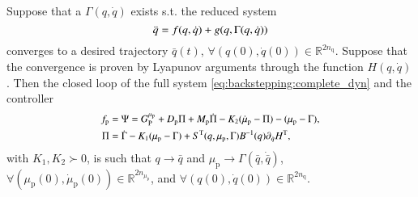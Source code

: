 \begin{theo}
	Suppose that a $\Gamma(q,\dot{q})$ exists s.t. the reduced system
	\begin{equation}\small\label{eq:backstepping:reduced_sys}
		\ddot{q} = f(q,\dot{q}) + g(q,\Gamma(q,\dot{q}))
	\end{equation}
	converges to a desired trajectory $\bar{q}(t)$, $\forall (q(0),\dot{q}(0)) \in \mathbb{R}^{2 n_{\mathrm{q}}}$. Suppose that the convergence is proven by Lyapunov arguments through the function $H(q,\dot{q})$. Then the closed loop of the full system \eqref{eq:backstepping:complete_dyn} and the controller
	\begin{equation}\small\label{eq:backstepping:pi_psi}
		\begin{split}
			f_\mathrm{p} &= \Psi = G_{\mathrm{P}}^{\mu_\mathrm{p}} + D_\mathrm{p} \Pi + M_\mathrm{p} \dot{\Pi} - K_2 (\dot{\mu}_\mathrm{p} - \Pi) - (\mu_\mathrm{p} - \Gamma),\\
			\Pi &= \dot{\Gamma} - K_1 (\mu_\mathrm{p} - \Gamma) 
			+ S^{\mathrm{T}}(q,\mu_\mathrm{p},\Gamma)B^{-1}(q)\partial_{\dot{q}} H^{\mathrm{T}},
		\end{split}
	\end{equation}
	with $K_1,K_2 \succ 0$, is such that $q \rightarrow \bar{q}$ and $\mu_\mathrm{p} \rightarrow \Gamma(\bar q,\dot{\bar q})$, $\forall (\mu_\mathrm{p}(0),\dot{\mu}_\mathrm{p}(0)) \in \mathbb{R}^{2n_{\mu_\mathrm{p}}}$, and $\forall (q(0),\dot{q}(0)) \in \mathbb{R}^{2 n_{\mathrm{q}}}$.
\end{theo}
